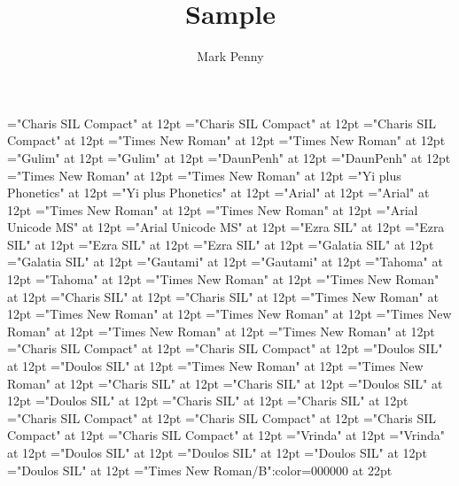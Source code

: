 \documentclass[a4paper,twoside]{article}
\begin{document}
\font\divlgrSBfonipaxetic="Charis SIL Compact" at 12pt
\font\spanlgrfonipa="Charis SIL Compact" at 12pt
\font\divlgrfonipa="Charis SIL Compact" at 12pt
\font\spanksk="Times New Roman" at 12pt
\font\divksk="Times New Roman" at 12pt
\font\spanko="Gulim" at 12pt
\font\divko="Gulim" at 12pt
\font\spankm="DaunPenh" at 12pt
\font\divkm="DaunPenh" at 12pt
\font\spankaw="Times New Roman" at 12pt
\font\divkaw="Times New Roman" at 12pt
\font\spanii="Yi plus Phonetics" at 12pt
\font\divii="Yi plus Phonetics" at 12pt
\font\spaniixpin="Arial" at 12pt
\font\diviixpin="Arial" at 12pt
\font\spanid="Times New Roman" at 12pt
\font\divid="Times New Roman" at 12pt
\font\spanhi="Arial Unicode MS" at 12pt
\font\divhi="Arial Unicode MS" at 12pt
\font\spanhe="Ezra SIL" at 12pt
\font\divhe="Ezra SIL" at 12pt
\font\spanhbo="Ezra SIL" at 12pt
\font\divhbo="Ezra SIL" at 12pt
\font\spangrc="Galatia SIL" at 12pt
\font\divgrc="Galatia SIL" at 12pt
\font\spanggoTeluIN="Gautami" at 12pt
\font\divggoTeluIN="Gautami" at 12pt
\font\spanggofonipaxemic="Tahoma" at 12pt
\font\divggofonipaxemic="Tahoma" at 12pt
\font\spanfr="Times New Roman" at 12pt
\font\divfr="Times New Roman" at 12pt
\font\spanfrZxxxxaudio="Charis SIL" at 12pt
\font\divfrZxxxxaudio="Charis SIL" at 12pt
\font\spanfa="Times New Roman" at 12pt
\font\divfa="Times New Roman" at 12pt
\font\spanes="Times New Roman" at 12pt
\font\dives="Times New Roman" at 12pt
\font\spanen="Times New Roman" at 12pt
\font\diven="Times New Roman" at 12pt
\font\spanenQaaaxtest="Charis SIL Compact" at 12pt
\font\divenQaaaxtest="Charis SIL Compact" at 12pt
\font\spanenfonipa="Doulos SIL" at 12pt
\font\divenfonipa="Doulos SIL" at 12pt
\font\spande="Times New Roman" at 12pt
\font\divde="Times New Roman" at 12pt
\font\spanbzh="Charis SIL" at 12pt
\font\divbzh="Charis SIL" at 12pt
\font\spanbzhfonipa="Doulos SIL" at 12pt
\font\divbzhfonipa="Doulos SIL" at 12pt
\font\spanbss="Charis SIL" at 12pt
\font\divbss="Charis SIL" at 12pt
\font\spanbssxako="Charis SIL Compact" at 12pt
\font\divbssxako="Charis SIL Compact" at 12pt
\font\spanbssfonipa="Charis SIL Compact" at 12pt
\font\divbssfonipa="Charis SIL Compact" at 12pt
\font\spanbn="Vrinda" at 12pt
\font\divbn="Vrinda" at 12pt
\font\spanauc="Doulos SIL" at 12pt
\font\divauc="Doulos SIL" at 12pt
\font\spanaucfonipaxemic="Doulos SIL" at 12pt
\font\divaucfonipaxemic="Doulos SIL" at 12pt
\color{black} 
\thispagestyle{empty} 
\font\CoverPageHeading="Times New Roman/B":color=000000 at 22pt 
\vskip 60pt 
\begin{center} 
\end{center} 
\newpage 
\newpage 
\thispagestyle{empty} 
\mbox{} 
\title{Sample} 
\author{ Mark Penny} 
\maketitle 
\thispagestyle{empty} 
\newpage 
\newpage 
\mbox{} 
\setcounter{page}{1} 
 
\pagestyle{plain} 
\newpage 
\newpage 
\thispagestyle{empty} 
\mbox{} 
\end{document}
